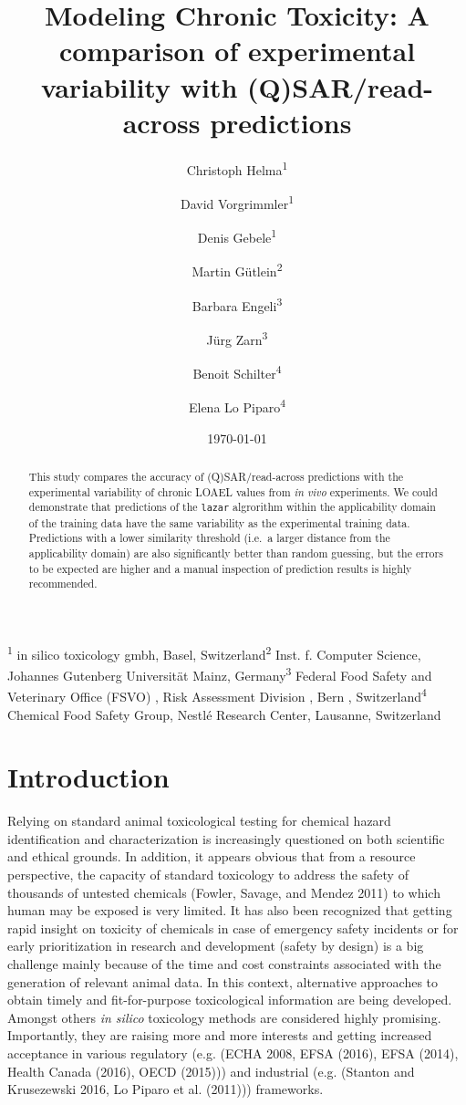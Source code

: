 \documentclass[]{achemso}
\title{Modeling Chronic Toxicity: A comparison of experimental variability with
(Q)SAR/read-across predictions}
\author{Christoph Helma\textsuperscript{1} \and David Vorgrimmler\textsuperscript{1} \and Denis Gebele\textsuperscript{1} \and Martin Gütlein\textsuperscript{2} \and Barbara Engeli\textsuperscript{3} \and Jürg Zarn\textsuperscript{3} \and Benoit Schilter\textsuperscript{4} \and Elena Lo Piparo\textsuperscript{4}}
\date{\today}
\begin{document}
\maketitle
\begin{abstract}
This study compares the accuracy of (Q)SAR/read-across predictions with
the experimental variability of chronic LOAEL values from \emph{in vivo}
experiments. We could demonstrate that predictions of the \texttt{lazar}
algrorithm within the applicability domain of the training data have the
same variability as the experimental training data. Predictions with a
lower similarity threshold (i.e.~a larger distance from the
applicability domain) are also significantly better than random
guessing, but the errors to be expected are higher and a manual
inspection of prediction results is highly recommended.
\end{abstract}

\textsuperscript{1} in silico toxicology gmbh, Basel,
Switzerland\newline\textsuperscript{2} Inst. f. Computer Science,
Johannes Gutenberg Universität Mainz, Germany\newline\textsuperscript{3}
Federal Food Safety and Veterinary Office (FSVO) , Risk Assessment
Division , Bern , Switzerland\newline\textsuperscript{4} Chemical Food
Safety Group, Nestlé Research Center, Lausanne, Switzerland

\section{Introduction}\label{introduction}

Relying on standard animal toxicological testing for chemical hazard
identification and characterization is increasingly questioned on both
scientific and ethical grounds. In addition, it appears obvious that
from a resource perspective, the capacity of standard toxicology to
address the safety of thousands of untested chemicals (Fowler, Savage,
and Mendez 2011) to which human may be exposed is very limited. It has
also been recognized that getting rapid insight on toxicity of chemicals
in case of emergency safety incidents or for early prioritization in
research and development (safety by design) is a big challenge mainly
because of the time and cost constraints associated with the generation
of relevant animal data. In this context, alternative approaches to
obtain timely and fit-for-purpose toxicological information are being
developed. Amongst others \emph{in silico} toxicology methods are
considered highly promising. Importantly, they are raising more and more
interests and getting increased acceptance in various regulatory (e.g.
(ECHA 2008, EFSA (2016), EFSA (2014), Health Canada (2016), OECD
(2015))) and industrial (e.g. (Stanton and Krusezewski 2016, Lo Piparo
et al. (2011))) frameworks.
\end{document}
